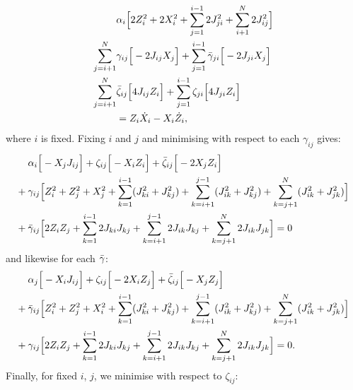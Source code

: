 \documentclass[a4paper,oneside,11pt]{book}
\newcommand{\gammabar}{\Bar{\gamma}}
\newcommand{\zetabar}{\Bar{\zeta}}
\begin{document}
\begin{equation}\label{eq:ising_graph_minimise_alpha}
    \begin{aligned}
        &\alpha_i \Big[2Z_i^2 + 2X_i^2 + \sum_{j = 1}^{i-1}2J_{ji}^2 + \sum_{i+1}^{N}2J_{ij}^2 \Big] \\
        \sum_{j = i+1}^N &\gamma_{ij} \Big[ -2J_{ij}X_j \Big] + \sum_{j = 1}^{i-1} \gammabar_{ji} \Big[ -2J_{ji}X_j \Big] \\
        \sum_{j = i+1}^N &\zetabar_{ij} \Big[ 4J_{ij}Z_i \Big] + \sum_{j = 1}^{i-1} \zeta_{ji} \Big[4 J_{ji}Z_i \Big] \\
        &= Z_i \dot{X}_i - X_i \dot{Z}_i,
    \end{aligned}
\end{equation}
where $i$ is fixed. Fixing $i$ and $j$ and minimising with respect to each $\gamma_{ij}$ gives:
\begin{equation}\label{eq:ising_graph_minimise_gamma}
    \begin{aligned}
        &\alpha_i\Big[ -X_j J_{ij} \Big] + \zeta_{ij}\Big[ -  X_i Z_i\Big] + \zetabar_{ij} \Big[ -2 X_j Z_i \Big] \\
        + \: &\gamma_{ij} \Big[ Z_i^2 + Z_j^2 + X_j^2 + \sum_{k = 1}^{i-1} (J_{ki}^2 + J_{kj}^2) + \sum_{k = i+1}^{j-1} (J_{ik}^2 + J_{kj}^2) + \sum_{k = j+1}^N (J_{ik}^2 + J_{jk}^2) \Big] \\
        + \: &\gammabar_{ij} \Big[ 2 Z_i Z_j + \sum_{k = 1}^{i-1} 2J_{ki}J_{kj} + \sum_{k = i+1}^{j-1} 2J_{ik}J_{kj} + \sum_{k = j+1}^N 2J_{ik}J_{jk} \Big] = 0
    \end{aligned}
\end{equation}
and likewise for each $\gammabar$:
\begin{equation}\label{eq:ising_graph_minimise_gammabar}
    \begin{aligned}
        &\alpha_j\Big[ -X_i J_{ij} \Big] + \zeta_{ij}\Big[ - 2 X_i Z_j\Big] + \zetabar_{ij} \Big[ - X_j Z_j \Big] \\
        + \: &\gammabar_{ij} \Big[ Z_i^2 + Z_j^2 + X_i^2 + \sum_{k = 1}^{i-1} (J_{ki}^2 + J_{kj}^2) + \sum_{k = i+1}^{j-1} (J_{ik}^2 + J_{kj}^2) + \sum_{k = j+1}^N (J_{ik}^2 + J_{jk}^2) \Big] \\
        + \: &\gamma_{ij} \Big[ 2 Z_i Z_j + \sum_{k = 1}^{i-1} 2J_{ki}J_{kj} + \sum_{k = i+1}^{j-1} 2J_{ik}J_{kj} + \sum_{k = j+1}^N 2J_{ik}J_{jk} \Big] = 0.
    \end{aligned}
\end{equation}
Finally, for fixed $i$, $j$, we minimise with respect to $\zeta_{ij}$:
\end{document}
